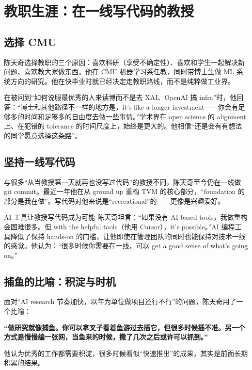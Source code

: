 \section{教职生涯：在一线写代码的教授}

\subsection{选择 CMU}

陈天奇选择教职的三个原因：喜欢科研（享受不确定性）、喜欢和学生一起解决新问题、喜欢教大家做东西。他在 CMU 机器学习系任教，同时带博士生做 ML 系统方向的研究。他在快毕业时就已经决定走教职路线，而不是纯粹做工业界。

在被问到``如何说服最优秀的人来读博而不是去 XAI、OpenAI 搞 infra''时，他回答：``博士和其他路径不一样的地方是，it's like a longer investment------你会有足够多的时间和足够多的自由度去做一些事情。''学术界在 open science 的 alignment 上、在犯错的 tolerance 的时间尺度上，始终是更大的。他相信``还是会有有想法的同学愿意选择这条路''。

\subsection{坚持一线写代码}

与很多``从当教授第一天就再也没写过代码''的教授不同，陈天奇至今仍在一线做 git commit。最近一年他在从 ground up 重构 TVM 的核心部分，``foundation 的部分是我在做''。写代码对他来说是``recreational''的------更像是兴趣爱好。

\begin{knowledgebox}{AI 工具让教授写代码成为可能}
陈天奇坦言：``如果没有 AI based tools，我做重构会困难很多。但 with the helpful tools（他用 Cursor），it's possible。''AI 编程工具降低了保持 hands-on 的门槛，让他即使在管理团队的同时也能保持对技术一线的感觉。他认为：``很多时候你需要在一线，可以 get a good sense of what's going on。''
\end{knowledgebox}

\subsection{捕鱼的比喻：积淀与时机}

面对``AI research 节奏加快，以年为单位做项目还行不行''的问题，陈天奇用了一个比喻：

\textbf{``做研究就像捕鱼。你可以拿叉子看着鱼游过去插它，但很多时候插不准。另一个方式是慢慢编一张网，当鱼来的时候，撒了几次之后或许可以抓到。''}

他认为优秀的工作都需要积淀，很多时候看似``快速推出''的成果，其实是前面长期积累的结果。

